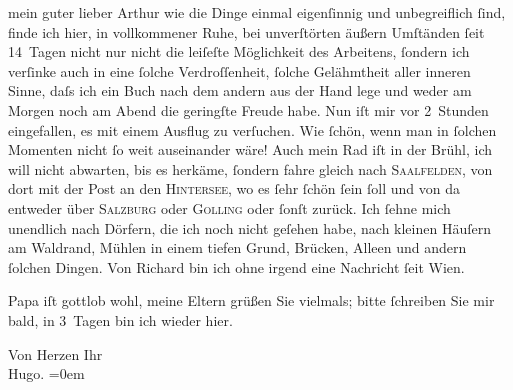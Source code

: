 \pstart{}mein guter lieber Arthur\pend\vspace{0.5em}
\pstart
           wie die Dinge einmal eigenſinnig und unbegreiflich{ }ſind, finde ich hier, in
               vollkommener Ruhe, bei unverſtörten äußern Umſtänden{ }ſeit 14 Tagen nicht nur nicht
               die leiſeſte Möglichkeit des Arbeitens,{ }ſondern ich verſinke auch in eine{ }ſolche
               Verdroſſenheit,{ }ſolche Gelähmtheit aller inneren Sinne, {\pb}daſs ich ein Buch nach dem andern
               aus der Hand lege und weder am Morgen noch am Abend die geringſte Freude habe. Nun
               iſt mir vor 2 Stunden eingefallen, es mit einem Ausflug zu verſuchen. Wie{ }ſchön, wenn
               man in{ }ſolchen Momenten nicht{ }ſo weit auseinander wäre! Auch mein Rad iſt in der {\pb}Brühl, ich will nicht abwarten, bis es herkäme,{ }ſondern fahre gleich nach \textsc{Saalfelden}, von dort mit der Post an den \textsc{Hintersee}, wo es{ }ſehr{ }ſchön{ }ſein{ }ſoll und von da entweder über \textsc{Salzburg} oder \textsc{Golling} oder{ }ſonſt zurück. Ich{ }ſehne mich unendlich nach Dörfern, die ich noch nicht
               geſehen habe, nach kleinen Häuſern am {\pb}Waldrand, Mühlen in einem tiefen
               Grund, Brücken, Alleen und andern{ }ſolchen Dingen. Von Richard bin ich ohne irgend eine Nachricht{ }ſeit Wien.\pend
           
\pstart
           Papa iſt gottlob wohl, meine
                  Eltern grüßen
               Sie vielmals; bitte{ }ſchreiben Sie mir bald, in 3 Tagen bin ich wieder hier.\pend
           
\pstart
           Von Herzen Ihr{\\[\baselineskip]}\spacefill\mbox{Hugo.}\pend
           \leftskip=0em{}\endnumbering{}  \newcommand{\dateiname}{L01056}\newcommand{\titel}{Hugo von Hofmannsthal an Arthur Schnitzler, 15. 7. 1900}\newcommand{\editorInnen}{Martin Anton Müller und Gerd-Hermann Susen}
